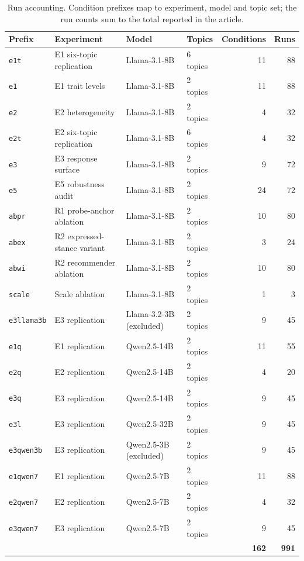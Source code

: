 \begin{table}[t]\centering
\small
\caption{Run accounting. Condition prefixes map to experiment, model and topic set; the run counts sum to the total reported in the article.}
\label{tab:runaccounting}
\begin{tabular}{@{}llllrr@{}}
\toprule
Prefix & Experiment & Model & Topics & Conditions & Runs \\
\midrule
\texttt{e1t} & E1 six-topic replication & Llama-3.1-8B & 6 topics & 11 & 88 \\
\texttt{e1} & E1 trait levels & Llama-3.1-8B & 2 topics & 11 & 88 \\
\texttt{e2} & E2 heterogeneity & Llama-3.1-8B & 2 topics & 4 & 32 \\
\texttt{e2t} & E2 six-topic replication & Llama-3.1-8B & 6 topics & 4 & 32 \\
\texttt{e3} & E3 response surface & Llama-3.1-8B & 2 topics & 9 & 72 \\
\texttt{e5} & E5 robustness audit & Llama-3.1-8B & 2 topics & 24 & 72 \\
\texttt{abpr} & R1 probe-anchor ablation & Llama-3.1-8B & 2 topics & 10 & 80 \\
\texttt{abex} & R2 expressed-stance variant & Llama-3.1-8B & 2 topics & 3 & 24 \\
\texttt{abwi} & R2 recommender ablation & Llama-3.1-8B & 2 topics & 10 & 80 \\
\texttt{scale} & Scale ablation & Llama-3.1-8B & 2 topics & 1 & 3 \\
\texttt{e3llama3b} & E3 replication & Llama-3.2-3B (excluded) & 2 topics & 9 & 45 \\
\texttt{e1q} & E1 replication & Qwen2.5-14B & 2 topics & 11 & 55 \\
\texttt{e2q} & E2 replication & Qwen2.5-14B & 2 topics & 4 & 20 \\
\texttt{e3q} & E3 replication & Qwen2.5-14B & 2 topics & 9 & 45 \\
\texttt{e3l} & E3 replication & Qwen2.5-32B & 2 topics & 9 & 45 \\
\texttt{e3qwen3b} & E3 replication & Qwen2.5-3B (excluded) & 2 topics & 9 & 45 \\
\texttt{e1qwen7} & E1 replication & Qwen2.5-7B & 2 topics & 11 & 88 \\
\texttt{e2qwen7} & E2 replication & Qwen2.5-7B & 2 topics & 4 & 32 \\
\texttt{e3qwen7} & E3 replication & Qwen2.5-7B & 2 topics & 9 & 45 \\
\midrule
& & & & \textbf{162} & \textbf{991} \\
\bottomrule
\end{tabular}
\end{table}
